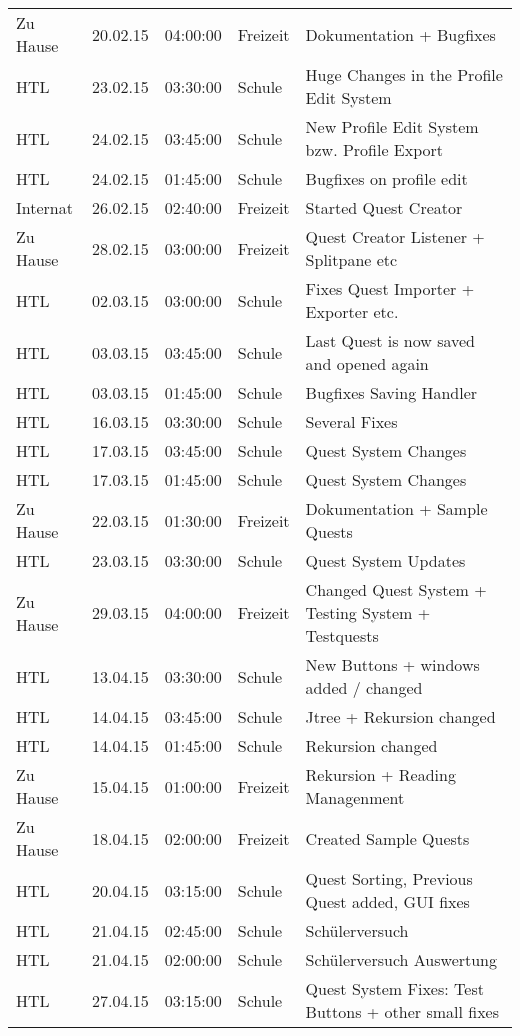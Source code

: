 \begin{small}
\begin{longtable}{ p{} p{} p{} p{} p{}}
Zu Hause	& 20.02.15	& 04:00:00	& Freizeit	& Dokumentation + Bugfixes \\
HTL	& 23.02.15	& 03:30:00	& Schule	& Huge Changes in the Profile Edit System \\
HTL	& 24.02.15	& 03:45:00	& Schule	& New Profile Edit System bzw. Profile Export \\
HTL	& 24.02.15	& 01:45:00	& Schule	& Bugfixes on profile edit \\
Internat	& 26.02.15	& 02:40:00	& Freizeit	& Started Quest Creator \\
Zu Hause	& 28.02.15	& 03:00:00	& Freizeit	& Quest Creator Listener + Splitpane etc \\
HTL	& 02.03.15	& 03:00:00	& Schule	& Fixes Quest Importer + Exporter etc. \\
HTL	& 03.03.15	& 03:45:00	& Schule	& Last Quest is now saved and opened again \\
HTL	& 03.03.15	& 01:45:00	& Schule	& Bugfixes Saving Handler \\
HTL	& 16.03.15	& 03:30:00	& Schule	& Several Fixes \\
HTL	& 17.03.15	& 03:45:00	& Schule	& Quest System Changes \\
HTL	& 17.03.15	& 01:45:00	& Schule	& Quest System Changes \\
Zu Hause	& 22.03.15	& 01:30:00	& Freizeit	& Dokumentation + Sample Quests \\
HTL	& 23.03.15	& 03:30:00	& Schule	& Quest System Updates \\
Zu Hause	& 29.03.15	& 04:00:00	& Freizeit	& Changed Quest System + Testing System + Testquests \\
HTL	& 13.04.15	& 03:30:00	& Schule	& New Buttons + windows added / changed \\
HTL	& 14.04.15	& 03:45:00	& Schule	& Jtree + Rekursion changed \\
HTL	& 14.04.15	& 01:45:00	& Schule	& Rekursion changed \\
Zu Hause	& 15.04.15	& 01:00:00	& Freizeit	& Rekursion + Reading Managenment \\
Zu Hause	& 18.04.15	& 02:00:00	& Freizeit	& Created Sample Quests \\
HTL	& 20.04.15	& 03:15:00	& Schule	& Quest Sorting, Previous Quest added, GUI fixes \\
HTL	& 21.04.15	& 02:45:00	& Schule	& Sch\"ulerversuch \\
HTL	& 21.04.15	& 02:00:00	& Schule	& Sch\"ulerversuch Auswertung \\
HTL	& 27.04.15	& 03:15:00	& Schule	& Quest System Fixes: Test Buttons + other small fixes \\

\end{longtable}
\end{small}
